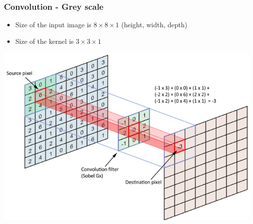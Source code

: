 \begin{frame}
	\frametitle{Convolution - Grey scale}

\begin{itemize}
	\item Size of the input image is $8 \times 8 \times 1$ (height, width, depth)
	
	\medskip 
	
	\item Size of the kernel is $3 \times 3 \times 1$
\end{itemize}

\begin{center}
	\includegraphics[scale=0.3]{figs/convolution.png}
\end{center}
	
\end{frame}












